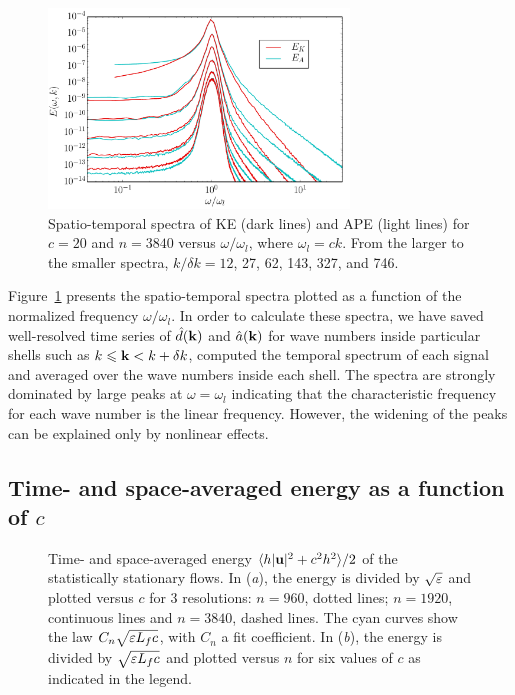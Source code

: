 \begin{figure}
\centerline{
\includegraphics[width=3.15in]{../Old/Figs/fig_spatiotempspectra_c20_Nh3840}}
\caption{Spatio-temporal spectra of KE (dark lines) and APE (light
lines) for $c = 20$ and $n = 3840$ versus $\omega/\omega_l$, where
$\omega_l = c k$.  From the larger to the smaller spectra, $k/\delta k
= 12$, 27, 62, 143, 327, and 746.  }
\label{fig_spatiotemp_spectra}
\end{figure}

Figure~\ref{fig_spatiotemp_spectra} presents the spatio-temporal
spectra plotted as a function of the normalized frequency
$\omega/\omega_l$.
In order to calculate these spectra, we have saved well-resolved time
series of $\hat d(\textbf{k})$ and $\hat a(\textbf{k})$ for wave numbers inside
particular shells such as $k\leqslant \textbf{k}<k+\delta k$, computed the
temporal spectrum of each signal and averaged over the wave numbers
inside each shell.
%
The spectra are strongly dominated by large peaks at $\omega =
\omega_l$ indicating that the characteristic frequency for each wave
number is the linear frequency.  However, the widening of the peaks
can be explained only by nonlinear effects.  












\subsection{Time- and space-averaged energy as a function of $c$}

\begin{figure}
\caption{Time- and space-averaged energy
$\langle h|\textbf{u}|^2 + c^2 h^2 \rangle/2$
of the statistically stationary flows.
%
In (\textit{a}), the energy is divided by
$\sqrt{\varepsilon}$ and plotted versus $c$ for 3 resolutions:
$n = 960$, dotted lines;
$n = 1920$, continuous lines and
$n = 3840$, dashed lines.
The cyan curves show the law $C_n \sqrt{\varepsilon L_f c}$,
with $C_n$ a fit coefficient.
%
In (\textit{b}), the energy is divided by
$\sqrt{\varepsilon L_f c}$ and plotted versus $n$
for six values of $c$ as indicated in the legend.
}
\label{fig_Evsc}
\end{figure}


